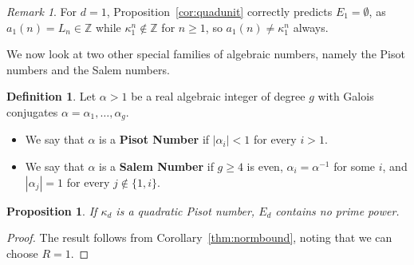 \documentclass{article}
\theoremstyle{plain}
\newtheorem{proposition}[theorem]{Proposition}
\theoremstyle{definition}
\newtheorem{definition}[theorem]{Definition}
\theoremstyle{remark}
\newtheorem{remark}[theorem]{Remark}
\newcommand{\Z}{\mathbb{Z}}
\begin{document}
\begin{remark}
For $d=1$, Proposition~\ref{cor:quadunit} correctly predicts $E_1=\emptyset$, as $a_1(n)=L_n\in\Z$ while $\kappa_1^n\notin\Z$ for $n\ge1$, so $a_1(n)\ne\kappa_1^n$ always. %
\end{remark}


We now look at two other special families of algebraic numbers, namely the Pisot numbers and the Salem numbers. 

\begin{definition}
Let $\alpha>1$ be a real algebraic integer of degree $g$ with Galois conjugates $\alpha = \alpha_1, \dots, \alpha_g$.  
    \begin{itemize}
        \item We say that $\alpha$ is a \textbf{Pisot Number} if $|\alpha_i|<1$ for every $i>1$.
        \item We say that $\alpha$ is a \textbf{Salem Number} if $g \geq 4$ is even, $\alpha_i=\alpha^{-1}$ for some $i$, and $|\alpha_j|=1$ for every $j \notin\{1,i\}$.
    \end{itemize}
\end{definition}


\begin{proposition}
If $\kappa_d$ is a quadratic Pisot number, $E_d$ contains no prime power.
\end{proposition}
\begin{proof}
    The result follows from Corollary~\ref{thm:normbound}, noting that we can choose $R=1$. 
\end{proof}

\end{document}

